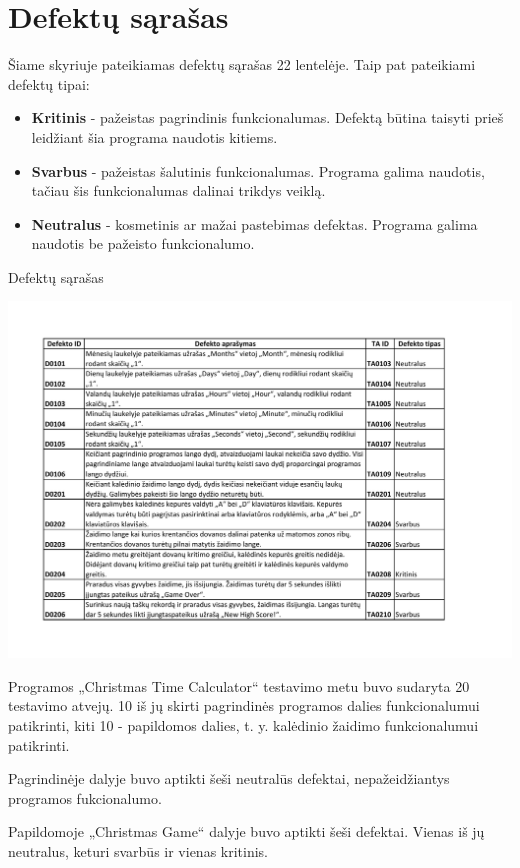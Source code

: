 \documentclass{VUMIFPSkursinis}
\begin{document}
	\section{Defektų sąrašas} \label{defektai}
		Šiame skyriuje pateikiamas defektų sąrašas 22 lentelėje. Taip pat pateikiami defektų tipai:
			\begin{itemize}
				\item \textbf{Kritinis} - pažeistas pagrindinis funkcionalumas. 
				Defektą būtina taisyti prieš leidžiant šia programa naudotis kitiems.
				\item \textbf{Svarbus} - pažeistas šalutinis funkcionalumas. 
				Programa galima naudotis, tačiau šis funkcionalumas dalinai trikdys veiklą.
				\item \textbf{Neutralus} - kosmetinis ar mažai pastebimas defektas.
				Programa galima naudotis be pažeisto funkcionalumo.
			\end{itemize}
			\begin{table}[H]
				\centering
				\caption{Defektų sąrašas}
				\includegraphics[width=\textwidth]{TA/Defektai}			
				\label{fig:DefektuSarasas}
			\end{table}
	 \label{rezultatai}
			Programos „Christmas Time Calculator“ testavimo metu buvo sudaryta 20 testavimo atvejų. 
			10 iš jų skirti pagrindinės programos dalies funkcionalumui patikrinti, kiti 10 - papildomos dalies, t. y. kalėdinio žaidimo
			funkcionalumui patikrinti.

			Pagrindinėje dalyje buvo aptikti šeši neutralūs defektai, nepažeidžiantys programos fukcionalumo.

			Papildomoje „Christmas Game“ dalyje buvo aptikti šeši defektai. Vienas iš jų neutralus, keturi svarbūs ir vienas kritinis.
	 \label{isvados}	
			
\end{document}
